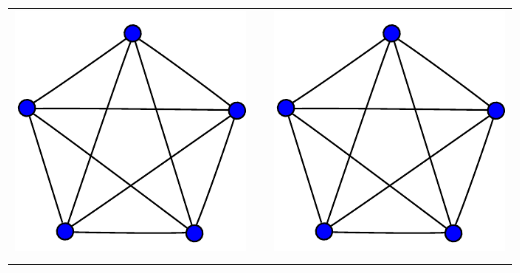 \documentclass[11pt,a4paper]{article}
\begin{document}
\begin{center}
\begin{tabular}{ccc}
\includegraphics[scale=.3]{./graphics/4-simplex_graph.pdf} & & \includegraphics[scale=.3]{./graphics/4-simplex_graph.pdf}\\
&&\\

\end{tabular}
\end{center}
\end{document}
